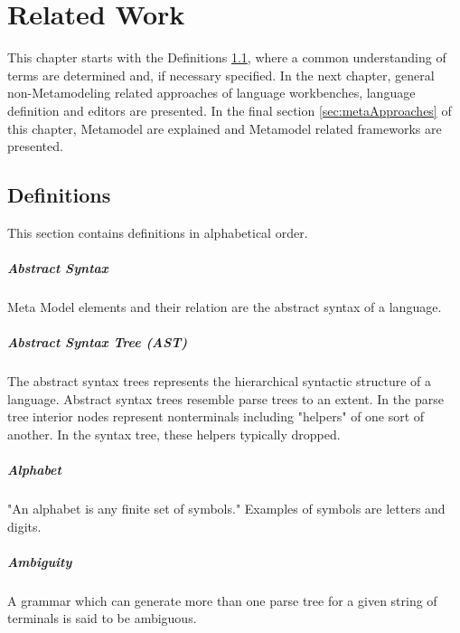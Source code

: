 \chapter{Related Work}
This chapter starts with the Definitions \ref{sec:def}, where a common understanding of terms are determined and, if necessary specified. In the next chapter, general non-Metamodeling related approaches of language workbenches, language definition and editors are presented. In the final section \ref{sec:metaApproaches} of this chapter, Metamodel are explained and Metamodel related frameworks are presented.

\section{Definitions} \label{sec:def}
This section contains definitions in alphabetical order.
\paragraph{Abstract Syntax} Meta Model elements and their relation are the abstract syntax of a language. \cite{MDSD}

\paragraph{Abstract Syntax Tree (AST)}  
The abstract syntax trees  represents the hierarchical syntactic structure of a language.  Abstract syntax trees resemble parse trees to an extent. In the parse tree interior nodes represent nonterminals including "helpers" of one sort of another. In the syntax tree, these helpers typically dropped. \cite{DragonBook}

\paragraph{Alphabet}
"An alphabet is any finite set of symbols." Examples of symbols are letters and digits. \cite{DragonBook}


\paragraph{Ambiguity} 
A grammar which can generate more than one parse tree for a given string of terminals is said to be ambiguous.\cite{DragonBook}

